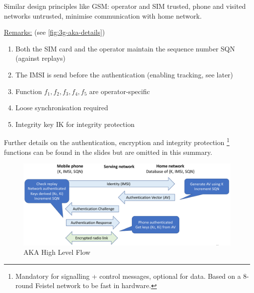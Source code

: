 Similar design principles like GSM: operator and SIM trusted, phone and visited networks untrusted, minimise communication with home network.

\underline{Remarks:} (see \autoref{fig:3g-aka-details})
\begin{enumerate}
	\item Both the SIM card and the operator maintain the sequence number SQN (against replays)
	\item The IMSI is send before the authentication (enabling tracking, see later)
	\item Function $f_1, f_2, f_3, f_4, f_5$ are operator-specific
	\item Loose synchronisation required
	\item Integrity key IK for integrity protection
\end{enumerate}

Further details on the authentication, encryption and integrity protection%
\footnote{Mandatory for signalling + control messages, optional for data. Based on a 8-round Feistel network to be fast in hardware.}
functions can be found in the slides but are omitted in this summary.

\begin{figure}
	\centering
	\includegraphics[scale=0.4]{images/10-3g-aka-overview.png}
	\caption{AKA High Level Flow}
	\label{fig:3g-aka-overview}
\end{figure}

